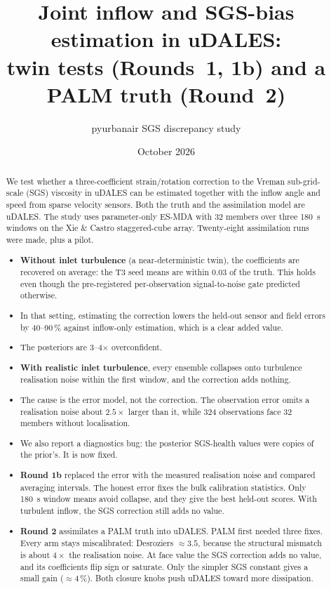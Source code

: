 \documentclass[11pt,a4paper]{article}
\title{Joint inflow and SGS-bias estimation in uDALES:\\
       twin tests (Rounds~1, 1b) and a PALM truth (Round~2)}
\author{pyurbanair SGS discrepancy study}
\date{October 2026}
\begin{document}
\maketitle

\begin{abstract}
\noindent
We test whether a three-coefficient strain/rotation correction to the Vreman
sub-grid-scale (SGS) viscosity in uDALES can be estimated together with the
inflow angle and speed from sparse velocity sensors. Both the truth and the
assimilation model are uDALES. The study uses parameter-only ES-MDA with 32
members over three \SI{180}{s} windows on the Xie \& Castro staggered-cube
array. Twenty-eight assimilation runs were made, plus a pilot.

\begin{itemize}
\item \textbf{Without inlet turbulence} (a near-deterministic twin), the
  coefficients are recovered on average: the T3 seed means are within 0.03 of
  the truth. This holds even though the pre-registered per-observation
  signal-to-noise gate predicted otherwise.
\item In that setting, estimating the correction lowers the held-out sensor
  and field errors by 40--90\,\% against inflow-only estimation, which is a
  clear added value.
\item The posteriors are 3--4$\times$ overconfident.
\item \textbf{With realistic inlet turbulence}, every ensemble collapses onto
  turbulence realisation noise within the first window, and the correction
  adds nothing.
\item The cause is the error model, not the correction. The observation error
  omits a realisation noise about $2.5\times$ larger than it, while 324
  observations face 32 members without localisation.
\item We also report a diagnostics bug: the posterior SGS-health values were
  copies of the prior's. It is now fixed.
\item \textbf{Round 1b} replaced the error with the measured realisation noise
  and compared averaging intervals. The honest error fixes the bulk
  calibration statistics. Only \SI{180}{s} window means avoid collapse, and
  they give the best held-out scores. With turbulent inflow, the SGS
  correction still adds no value.
\item \textbf{Round 2} assimilates a PALM truth into uDALES. PALM first needed
  three fixes. Every arm stays miscalibrated: Desroziers $\approx3.5$,
  because the structural mismatch is about $4\times$ the realisation noise.
  At face value the SGS correction adds no value, and its coefficients
  flip sign or saturate. Only the simpler SGS constant gives a small gain
  ($\approx4\,\%$). Both closure knobs push uDALES toward more dissipation.
\end{itemize}
\end{abstract}
\end{document}
